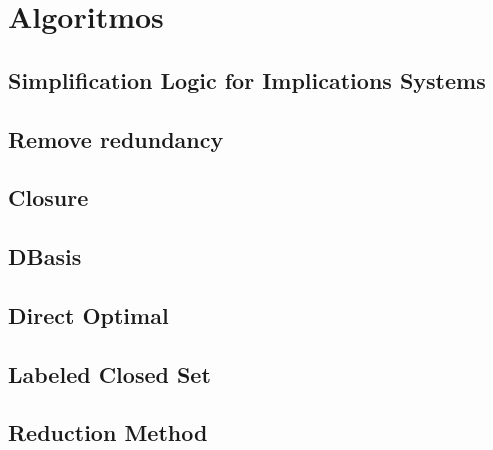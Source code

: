 \section{Algoritmos}

\subsection{Simplification Logic for Implications Systems}

 
\newpage

\subsection{Remove redundancy}

 
\newpage

\subsection{Closure}

 
\newpage

\subsection{DBasis}

 
\newpage

\subsection{Direct Optimal}

 
\newpage

\subsection{Labeled Closed Set}

 
\newpage

\subsection{Reduction Method}

 

\newpage
\thispagestyle{empty}
\mbox{}

\newpage